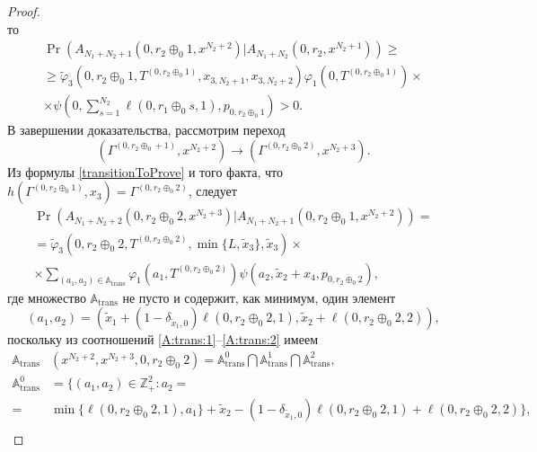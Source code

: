 \begin{proof}
\begin{equation*}
\end{equation*}
то  
\begin{multline*}
\Pr( A_{N_1 + N_2 + 1} (0,  r_2 \oplus_0 1,  x^{N_2+2})
|A_{N_1 + N_2} (0,  r_2,  x^{N_2 + 1}) )
\geqslant \\
\geqslant \widetilde{\varphi}_3(0, r_2 \oplus_0 1,  T^{(0, r_2 \oplus_0 1)},  x_{3,  N_2 + 1}, x_{3,  N_2 + 2})
\varphi_1(0,  T^{(0,  r_2 \oplus_0 1)})\times\\
\times\psi(0,  \sum_{s=1}^{N_2} \ell(0, r_1 \oplus_0 s, 1),  p_{0,  r_2 \oplus_0 1})  > 0.
\end{multline*}
В завершении доказательства,  рассмотрим переход 
$$
(\Gamma^{(0,  r_2 \oplus_0 + 1)},  x^{N_2+2}) \rightarrow (\Gamma^{(0,  r_2 \oplus_0 2)},  x^{N_2+3}).
$$
Из формулы \eqref{transitionToProve} и того факта,  что $h(\Gamma^{(0,  r_2 \oplus_0 1)},  x_3) = \Gamma^{(0,  r_2 \oplus_0 2 )}$,  следует
\begin{multline*}
\Pr( A_{N_1 + N_2 + 2} (0,  r_2 \oplus_0 2,  x^{N_2+3})
|A_{N_1 + N_2 + 1} (0,  r_2\oplus_0 1,  x^{N_2 + 2}) )
=\\
=\widetilde{\varphi}_3(0,  r_2 \oplus_0 2,  T^{(0,  r_2 \oplus_0 2)},  \min\{L,  \tilde{x}_3\},  \tilde{x}_3) 
\times \\ \times
\sum_{(a_1,  a_2)\in {\mathbb A}_{\mathrm{trans}}}\varphi_1(a_1,  T^{(0,  r_2 \oplus_0 2)}) \psi(a_2,  \tilde{x}_2+x_4,  p_{0,  r_2 \oplus_0  2}), 
\end{multline*}
где множество ${\mathbb A}_{\mathrm{trans}}$ не пусто и содержит,  как минимум,  один элемент
$$
(a_1,  a_2)=(\tilde{x}_1 + (1 - \delta_{\tilde{x}_1, 0})\ell(0,  r_2 \oplus_0 2,  1), \tilde{x}_2 + \ell(0,  r_2 \oplus_0 2,  2)),$$  поскольку из соотношений \eqref{A:trans:1}--\eqref{A:trans:2} имеем
\begin{align*}
{\mathbb A}_{\mathrm{trans}}&(x^{N_2+2},  x^{N_2+3},  0,  r_2 \oplus_0 2) = {\mathbb A}_{\mathrm{trans}}^0 \bigcap {\mathbb A}_{\mathrm{trans}}^1\bigcap {\mathbb A}_{\mathrm{trans}}^2, \\
{\mathbb A}_{\mathrm{trans}}^0 &= \{(a_1,  a_2) \in \mathbb{Z}_+^2 \colon a_2 =\\
=&\min{\{\ell(0,  r_2 \oplus_0 2,  1),  a_1}\}   + \tilde{x}_2 - (1 - \delta_{\tilde{x}_1, 0})\ell(0, r_2 \oplus_0 2, 1) + \ell(0, r_2 \oplus_0 2, 2) \}, \\

\end{align*}
\end{proof}
